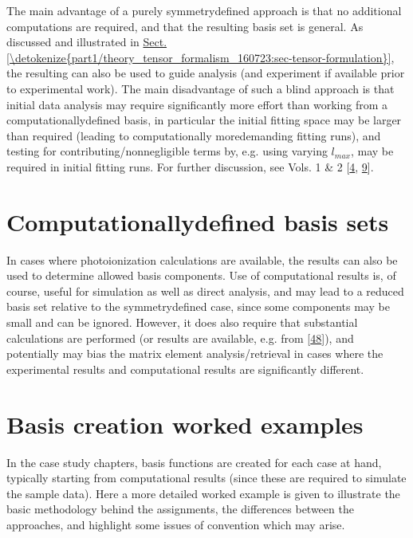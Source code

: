 \documentclass[letterpaper,table,10pt,english]{jupyterBook}
\begin{document}
\sphinxAtStartPar
The main advantage of a purely symmetry\sphinxhyphen{}defined approach is that no additional  computations are required, and that the resulting basis set is general. As discussed and illustrated in \hyperref[\detokenize{part1/theory_tensor_formalism_160723:sec-tensor-formulation}]{Sect.\@ \ref{\detokenize{part1/theory_tensor_formalism_160723:sec-tensor-formulation}}}, the resulting {\hyperref[\detokenize{backmatter/glossary:term-channel-functions}]{}} can also be used to guide analysis (and experiment if available prior to experimental work). The main disadvantage of such a blind approach is that initial data analysis may require significantly more effort than working from a computationally\sphinxhyphen{}defined basis, in particular the initial fitting space may be larger than required (leading to computationally more\sphinxhyphen{}demanding fitting runs), and testing for contributing/non\sphinxhyphen{}negligible terms by, e.g. using varying \(l_{max}\), may be required in initial fitting runs. For further discussion, see  Vols. 1 \& 2 {[}\hyperlink{cite.backmatter/bibliography:id677}{4}, \hyperlink{cite.backmatter/bibliography:id678}{9}{]}.


\section{Computationally\sphinxhyphen{}defined basis sets}
\label{\detokenize{part2/sym-fitting-intro_240723:computationally-defined-basis-sets}}
\sphinxAtStartPar
In cases where photoionization calculations are available, the results can also be used to determine allowed basis components. Use of  computational results is, of course, useful for simulation as well as direct analysis, and may lead to a reduced basis set relative to the symmetry\sphinxhyphen{}defined case, since some components may be small and can be ignored. However, it does also require that substantial calculations are performed (or results are available, e.g. from  {[}\hyperlink{cite.backmatter/bibliography:id679}{48}{]}), and \sphinxhyphen{} potentially \sphinxhyphen{} may bias the matrix element analysis/retrieval in cases where the experimental results and computational results are significantly different.


\section{Basis creation worked examples}
\label{\detokenize{part2/sym-fitting-intro_240723:basis-creation-worked-examples}}
\sphinxAtStartPar
In the case study chapters, basis functions are created for each case at hand, typically starting from  computational results (since these are required to simulate the sample data). Here a more detailed worked example is given to illustrate the basic methodology behind the assignments, the differences between the approaches, and highlight some issues of convention which may arise.
\end{document}
